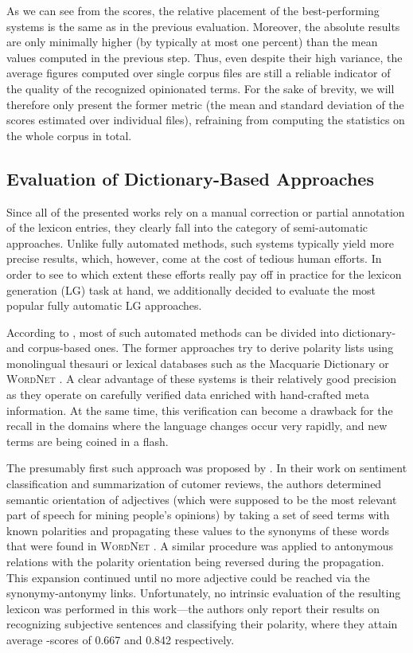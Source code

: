 As we can see from the scores, the relative placement of the
best-performing systems is the same as in the previous evaluation.
Moreover, the absolute results are only minimally higher (by typically
at most one percent) than the mean values computed in the previous
step.  Thus, even despite their high variance, the average figures
computed over single corpus files are still a reliable indicator of
the quality of the recognized opinionated terms.  For the sake of
brevity, we will therefore only present the former metric (the mean
and standard deviation of the scores estimated over individual files),
refraining from computing the statistics on the whole corpus in total.

\subsection{Evaluation of Dictionary-Based Approaches}

Since all of the presented works rely on a manual correction or
partial annotation of the lexicon entries, they clearly fall into the
category of semi-automatic approaches.  Unlike fully automated
methods, such systems typically yield more precise results, which,
however, come at the cost of tedious human efforts.  In order to see
to which extent these efforts really pay off in practice for the
lexicon generation (LG) task at hand, we additionally decided to
evaluate the most popular fully automatic LG approaches.

According to \citet[p. 79]{Liu:12}, most of such automated methods can
be divided into dictionary- and corpus-based ones.  The former
approaches try to derive polarity lists using monolingual thesauri or
lexical databases such as the Macquarie Dictionary \cite{Bernard:86}
or \textsc{WordNet} \cite{Miller:95}.  A clear advantage of these
systems is their relatively good precision as they operate on
carefully verified data enriched with hand-crafted meta information.
At the same time, this verification can become a drawback for the
recall in the domains where the language changes occur very rapidly,
and new terms are being coined in a flash.

The presumably first such approach was proposed by \citet{Hu:04}.  In
their work on sentiment classification and summarization of cutomer
reviews, the authors determined semantic orientation of adjectives
(which were supposed to be the most relevant part of speech for mining
people's opinions) by taking a set of seed terms with known polarities
and propagating these values to the synonyms of these words that were
found in \textsc{WordNet} \cite{Miller:95}.  A similar procedure was
applied to antonymous relations with the polarity orientation being
reversed during the propagation.  This expansion continued until no
more adjective could be reached via the synonymy-antonymy links.
Unfortunately, no intrinsic evaluation of the resulting lexicon was
performed in this work---the authors only report their results on
recognizing subjective sentences and classifying their polarity, where
they attain average \F-scores of 0.667 and 0.842 respectively.

